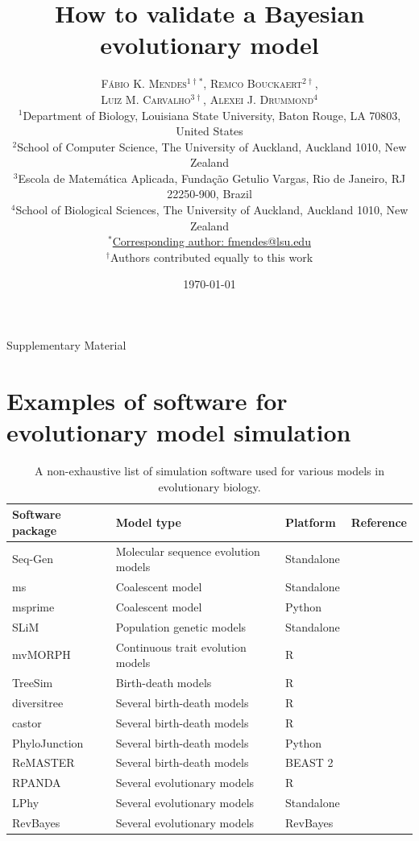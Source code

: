 \documentclass[oneside]{article}
\title{How to validate a Bayesian evolutionary model} %
\author{\textsc{F\'{a}bio K. Mendes$^{1\dagger*}$}, \textsc{Remco Bouckaert$^{2\dagger}$},\\
\textsc{Luiz M. Carvalho$^{3\dagger}$}, \textsc{Alexei J. Drummond$^{4}$} \\
\small $^1$Department of Biology, Louisiana State University, Baton Rouge, LA 70803, United States\\
\small $^2$School of Computer Science, The University of Auckland, Auckland 1010, New Zealand\\
\small $^3$Escola de Matem\'{a}tica Aplicada, Fundaç\~{a}o Getulio Vargas, Rio de Janeiro, RJ 22250-900, Brazil\\
\small $^4$School of Biological Sciences, The University of Auckland, Auckland 1010, New Zealand\\
\small
\href{mailto:fmendes@lsu.edu}{$^*$Corresponding author: fmendes@lsu.edu}\\
{\small $^\dagger$Authors contributed equally to this work}
}
\date{\today} %
\begin{document}
\maketitle

\begin{center}
    \Large Supplementary Material
\end{center}

\newpage



\section{Examples of software for evolutionary model simulation}

\begin{center}
  \begin{table}[h]
  \caption{A non-exhaustive list of simulation software used for various models in evolutionary biology.}
  \label{suptab:sim}
  \centering
  \begin{tabular}{ p{0.7in} p{1.5in} p{1in} p{1.3in} }
    \hline
    Software package & Model type & Platform & Reference \\
    \hline  
    \rowcolor{gray!10}Seq-Gen & Molecular sequence evolution models & Standalone & \citealp{rambaut97} \\
    ms & Coalescent model & Standalone & \citealp{hudson02}\\
    \rowcolor{gray!10}msprime & Coalescent model & Python & \citealp{kelleher16}\\
    SLiM & Population genetic models & Standalone & \citealp{haller19}\\    
    \rowcolor{gray!10}mvMORPH & Continuous trait evolution models & R & \citealp{clavel15}\\
    TreeSim & Birth-death models & R & \citealp{stadler11}\\
    \rowcolor{gray!10}diversitree & Several birth-death models & R & \citealp{fitzjohn12}\\
    castor & Several birth-death models & R & \citealp{castor}\\
    \rowcolor{gray!10}PhyloJunction & Several birth-death models & Python & \citealp{mendes24}\\
    ReMASTER & Several birth-death models & BEAST 2 & \citealp{vaughan24}\\
    \rowcolor{gray!10}RPANDA & Several evolutionary models & R & \citealp{rpanda}\\
    LPhy & Several evolutionary models & Standalone & \citealp{drummond23}\\
    \rowcolor{gray!10}RevBayes & Several evolutionary models & RevBayes & \citealp{revbayes}\\
    \hline
  \end{tabular}
  \end{table}
\end{center}
\end{document}
